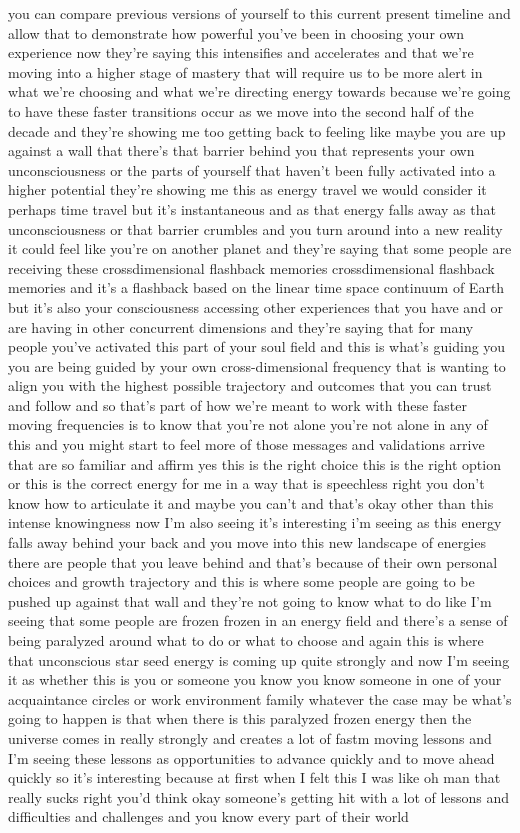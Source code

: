 \documentclass{article}
\begin{document}
you can compare previous versions of yourself to this current present timeline and allow that to demonstrate how powerful you've been in choosing your own experience now they're saying this intensifies and accelerates and that we're moving into a higher stage of mastery that will require us to be more alert in what we're choosing and what we're directing energy towards because we're going to have these faster transitions occur as we move into the second half of the decade and they're showing me too getting back to feeling like maybe you are up against a wall that there's that barrier behind you that represents your own unconsciousness or the parts of yourself that haven't been fully activated into a higher potential they're showing me this as energy travel we would consider it perhaps time travel but it's instantaneous and as that energy falls away as that unconsciousness or that barrier crumbles and you turn around into a new reality it could feel like you're on another planet and they're saying that some people are receiving these crossdimensional flashback memories crossdimensional flashback memories and it's a flashback based on the linear time space continuum of Earth but it's also your consciousness accessing other experiences that you have and or are having in other concurrent dimensions and they're saying that for many people you've activated this part of your soul field and this is what's guiding you you are being guided by your own cross-dimensional frequency that is wanting to align you with the highest possible trajectory and outcomes that you can trust and follow and so that's part of how we're meant to work with these faster moving frequencies is to know that you're not alone you're not alone in any of this and you might start to feel more of those messages and validations arrive that are so familiar and affirm yes this is the right choice this is the right option or this is the correct energy for me in a way that is speechless right you don't know how to articulate it and maybe you can't and that's okay other than this intense knowingness now I'm also seeing it's interesting i'm seeing as this energy falls away behind your back and you move into this new landscape of energies there are people that you leave behind and that's because of their own personal choices and growth trajectory and this is where some people are going to be pushed up against that wall and they're not going to know what to do like I'm seeing that some people are frozen frozen in an energy field and there's a sense of being paralyzed around what to do or what to choose and again this is where that unconscious star seed energy is coming up quite strongly and now I'm seeing it as whether this is you or someone you know you know someone in one of your acquaintance circles or work environment family whatever the case may be what's going to happen is that when there is this paralyzed frozen energy then the universe comes in really strongly and creates a lot of fastm moving lessons and I'm seeing these lessons as opportunities to advance quickly and to move ahead quickly so it's interesting because at first when I felt this I was like oh man that really sucks right you'd think okay someone's getting hit with a lot of lessons and difficulties and challenges and you know every part of their world 
\end{document}
